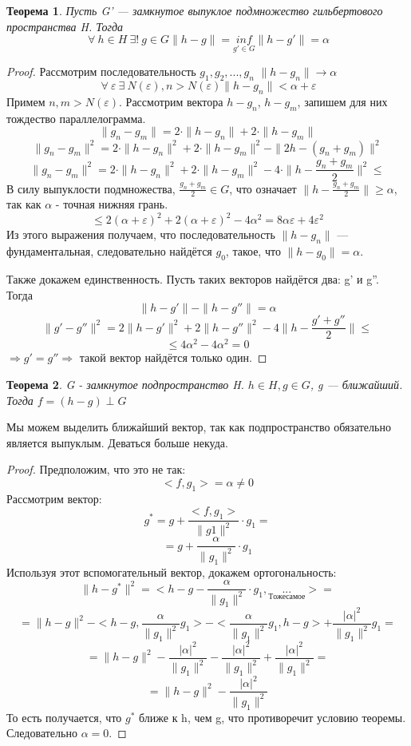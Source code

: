 \documentclass[12pt]{article}
\let\existstemp\exists
\let\foralltemp\forall
\renewcommand{\exists}{\: \existstemp \:}
\newcommand{\existsonly}{\: \existstemp ! \:}
\renewcommand{\forall}{\: \foralltemp \:}
\newcommand{\norm}[1]{\| #1 \|}
\renewcommand{\leq}{\leqslant}
\renewcommand{\geq}{\geqslant}
\newtheorem{theorem}{Теорема}[section] %
\begin{document}
	\begin{theorem}
		Пусть G' --- замкнутое выпуклое подмножество гильбертового пространства H. Тогда
		$$\forall h \in H \existsonly g \in G \norm{h-g} = \underset{g' \in G}{inf} \norm{h-g'} = \alpha$$
	\end{theorem}
	\begin{proof}
		Рассмотрим последовательность $g_1, g_2, ..., g_n$ $\norm{h - g_n} \rightarrow \alpha$
		$$\forall \varepsilon \exists N(\varepsilon), n > N(\varepsilon) \norm{h - g_n} < \alpha + \varepsilon$$
		Примем $n, m > N(\varepsilon)$. Рассмотрим вектора $h - g_n$, $h - g_m$, запишем для них тождество параллелограмма.
		$$\norm{g_n - g_m} = 2 \cdot \norm{h - g_n} + 2 \cdot \norm{h - g_m}$$
		$$\norm{g_n - g_m}^2 = 2 \cdot \norm{h - g_n}^2 + 2 \cdot \norm{h - g_m}^2 - \norm{2h - (g_n + g_m)}^2$$
		$$\norm{g_n - g_m}^2 = 2 \cdot \norm{h - g_n}^2 + 2 \cdot \norm{h - g_m}^2 - 4 \cdot \norm{h - \frac{g_n + g_m}{2}}^2 \leq$$
		В силу выпуклости подмножества, $\frac{g_n + g_m}{2} \in G$, что означает $\norm{h - \frac{g_n + g_m}{2}} \geq \alpha$, так
		как $\alpha$ - точная нижняя грань.
		$$\leq 2 (\alpha + \varepsilon)^2 + 2 (\alpha + \varepsilon)^2 - 4 \alpha^2 = 8 \alpha \varepsilon + 4 \varepsilon^2$$
		Из этого выражения получаем, что последовательность $\norm{h - g_n}$ --- фундаментальная, следовательно найдётся $g_0$, такое,
		что $\norm{h - g_0} = \alpha$.
		
		Также докажем единственность. Пусть таких векторов найдётся два: g' и g''. Тогда
		$$\norm{h - g'} - \norm{h - g''} = \alpha$$
		$$\norm{g' - g''}^2 = 2 \norm{h - g'}^2 + 2 \norm{h - g''}^2 - 4 \norm{h - \frac{g' + g''}{2}} \leq$$
		$$\leq 4 \alpha^2 - 4 \alpha^2 = 0$$
		$\Rightarrow g' = g'' \Rightarrow$ такой вектор найдётся только один.
	\end{proof}
	
	\begin{theorem}
		G - замкнутое подпространство H. $h \in H, g \in G$, g --- ближайший. Тогда $f = (h - g) \perp G$
	\end{theorem}
	Мы можем выделить ближайший вектор, так как подпространство обязательно является выпуклым. {\color{gray} Деваться больше некуда.}
	\begin{proof}
		Предположим, что это не так:
		$$<f, g_1> = \alpha \neq 0$$
		Рассмотрим вектор:
		$$g^* = g + \frac{<f, g_1>}{\norm{g1}^2} \cdot g_1 = $$
		$$ = g + \frac{\alpha}{\norm{g_1}^2} \cdot g_1$$
		Используя этот вспомогательный вектор, докажем ортогональность:
		$$\norm{h - g^*}^2 = <h - g - \frac{\alpha}{\norm{g_1}^2} \cdot g_1, \underset{То же самое}{...}> = $$
		$$ = \norm{h - g}^2 - <h - g, \frac{\alpha}{\norm{g_1}^2} g_1> - <\frac{\alpha}{\norm{g_1}^2} g_1, h - g> + 
		\frac{|\alpha|^2}{\norm{g_1}^2} g_1 = $$
		$$ = \norm{h - g}^2 - \frac{|\alpha|^2}{\norm{g_1}^2} - \frac{|\alpha|^2}{\norm{g_1}^2} + \frac{|\alpha|^2}{\norm{g_1}^2} = $$
		$$ = \norm{h - g}^2 - \frac{|\alpha|^2}{\norm{g_1}^2}$$
		То есть получается, что $g^*$ ближе к h, чем g, что противоречит условию теоремы. Следовательно $\alpha = 0$.
	\end{proof}
	
\end{document}
